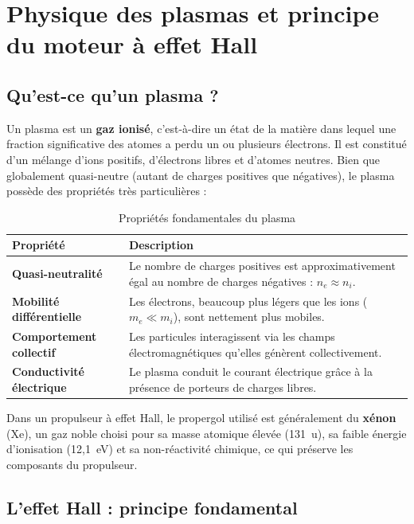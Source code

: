 \documentclass[12pt,a4paper]{article}
\begin{document}
\section{Physique des plasmas et principe du moteur à effet Hall}

\subsection{Qu'est-ce qu'un plasma ?}

Un plasma est un \textbf{gaz ionisé}, c'est-à-dire un état de la matière dans lequel une fraction significative des atomes a perdu un ou plusieurs électrons. Il est constitué d'un mélange d'ions positifs, d'électrons libres et d'atomes neutres. Bien que globalement quasi-neutre (autant de charges positives que négatives), le plasma possède des propriétés très particulières :

\begin{table}[H]
\centering
\caption{Propriétés fondamentales du plasma}
\begin{tabular}{>{\bfseries}l p{10cm}}
\toprule
Propriété & Description \\
\midrule
Quasi-neutralité & Le nombre de charges positives est approximativement égal au nombre de charges négatives : $n_e \approx n_i$. \\
Mobilité différentielle & Les électrons, beaucoup plus légers que les ions ($m_e \ll m_i$), sont nettement plus mobiles. \\
Comportement collectif & Les particules interagissent via les champs électromagnétiques qu'elles génèrent collectivement. \\
Conductivité électrique & Le plasma conduit le courant électrique grâce à la présence de porteurs de charges libres. \\
\bottomrule
\end{tabular}
\end{table}

Dans un propulseur à effet Hall, le propergol utilisé est généralement du \textbf{xénon} (Xe), un gaz noble choisi pour sa masse atomique élevée (131~u), sa faible énergie d'ionisation (12,1~eV) et sa non-réactivité chimique, ce qui préserve les composants du propulseur.

\subsection{L'effet Hall : principe fondamental}
\end{document}
